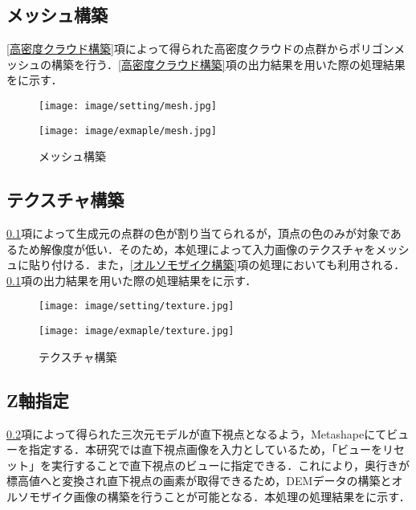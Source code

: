     \subsection{メッシュ構築}
      \label{メッシュ構築}
      \ref{高密度クラウド構築}項によって得られた高密度クラウドの点群からポリゴンメッシュの構築を行う．\ref{高密度クラウド構築}項の出力結果を用いた際の処理結果をに示す．

      \begin{figure}[tbp]
        \begin{minipage}[c]{0.45\hsize}
          \centering
          \texttt{[image: image/setting/mesh.jpg]}
        \end{minipage}
        \begin{minipage}[c]{0.45\hsize}
          \centering
          \texttt{[image: image/exmaple/mesh.jpg]}
        \end{minipage}
        \caption{メッシュ構築}
        \label{メッシュ構築結果}
      \end{figure}


    \subsection{テクスチャ構築}
      \label{テクスチャ構築}
      \ref{メッシュ構築}項によって生成元の点群の色が割り当てられるが，頂点の色のみが対象であるため解像度が低い．そのため，本処理によって入力画像のテクスチャをメッシュに貼り付ける．また，\ref{オルソモザイク構築}項の処理においても利用される．\ref{メッシュ構築}項の出力結果を用いた際の処理結果をに示す．

      \begin{figure}[tbp]
        \begin{minipage}[c]{0.45\hsize}
          \centering
          \texttt{[image: image/setting/texture.jpg]}
        \end{minipage}
        \begin{minipage}[c]{0.45\hsize}
          \centering
          \texttt{[image: image/exmaple/texture.jpg]}
        \end{minipage}
        \caption{テクスチャ構築}
        \label{テクスチャ構築結果}
      \end{figure}


    \subsection{Z軸指定}
      \label{Z軸指定}
      \ref{テクスチャ構築}項によって得られた三次元モデルが直下視点となるよう，Metashapeにてビューを指定する．本研究では直下視点画像を入力としているため，「ビューをリセット」を実行することで直下視点のビューに指定できる．これにより，奥行きが標高値へと変換され直下視点の画素が取得できるため，DEMデータの構築とオルソモザイク画像の構築を行うことが可能となる．本処理の処理結果をに示す．

